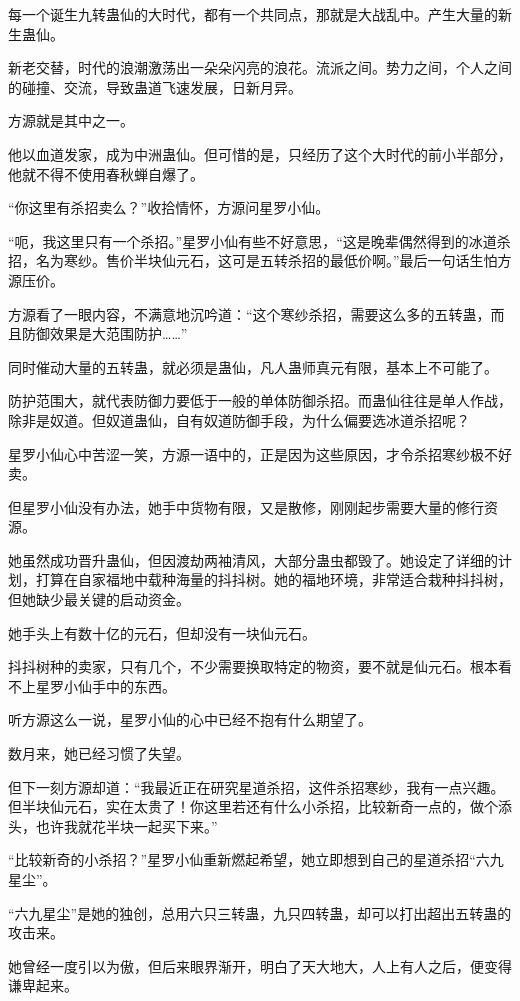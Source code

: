 \begin{this_body}
每一个诞生九转蛊仙的大时代，都有一个共同点，那就是大战乱中。产生大量的新生蛊仙。

新老交替，时代的浪潮激荡出一朵朵闪亮的浪花。流派之间。势力之间，个人之间的碰撞、交流，导致蛊道飞速发展，日新月异。

方源就是其中之一。

他以血道发家，成为中洲蛊仙。但可惜的是，只经历了这个大时代的前小半部分，他就不得不使用春秋蝉自爆了。

“你这里有杀招卖么？”收拾情怀，方源问星罗小仙。

“呃，我这里只有一个杀招。”星罗小仙有些不好意思，“这是晚辈偶然得到的冰道杀招，名为寒纱。售价半块仙元石，这可是五转杀招的最低价啊。”最后一句话生怕方源压价。

方源看了一眼内容，不满意地沉吟道：“这个寒纱杀招，需要这么多的五转蛊，而且防御效果是大范围防护……”

同时催动大量的五转蛊，就必须是蛊仙，凡人蛊师真元有限，基本上不可能了。

防护范围大，就代表防御力要低于一般的单体防御杀招。而蛊仙往往是单人作战，除非是奴道。但奴道蛊仙，自有奴道防御手段，为什么偏要选冰道杀招呢？

星罗小仙心中苦涩一笑，方源一语中的，正是因为这些原因，才令杀招寒纱极不好卖。

但星罗小仙没有办法，她手中货物有限，又是散修，刚刚起步需要大量的修行资源。

她虽然成功晋升蛊仙，但因渡劫两袖清风，大部分蛊虫都毁了。她设定了详细的计划，打算在自家福地中载种海量的抖抖树。她的福地环境，非常适合栽种抖抖树，但她缺少最关键的启动资金。

她手头上有数十亿的元石，但却没有一块仙元石。

抖抖树种的卖家，只有几个，不少需要换取特定的物资，要不就是仙元石。根本看不上星罗小仙手中的东西。

听方源这么一说，星罗小仙的心中已经不抱有什么期望了。

数月来，她已经习惯了失望。

但下一刻方源却道：“我最近正在研究星道杀招，这件杀招寒纱，我有一点兴趣。但半块仙元石，实在太贵了！你这里若还有什么小杀招，比较新奇一点的，做个添头，也许我就花半块一起买下来。”

“比较新奇的小杀招？”星罗小仙重新燃起希望，她立即想到自己的星道杀招“六九星尘”。

“六九星尘”是她的独创，总用六只三转蛊，九只四转蛊，却可以打出超出五转蛊的攻击来。

她曾经一度引以为傲，但后来眼界渐开，明白了天大地大，人上有人之后，便变得谦卑起来。


\end{this_body}
